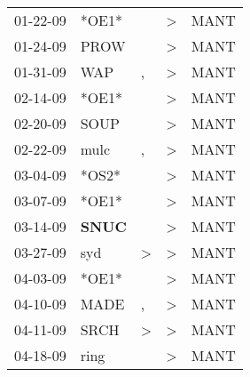 \begin{supertabular}{p{0.07\textwidth}p{0.06\textwidth}p{0.02\textwidth}p{0.02\textwidth}p{0.06\textwidth}}
          01-22-09\textsuperscript{} &                            *OE1* &                  &  \textgreater &           MANT\textsuperscript{} \\
          01-24-09\textsuperscript{} &           PROW\textsuperscript{} &                  &  \textgreater &           MANT\textsuperscript{} \\
          01-31-09\textsuperscript{} &            WAP\textsuperscript{} &                , &  \textgreater &           MANT\textsuperscript{} \\
          02-14-09\textsuperscript{} &                            *OE1* &                  &  \textgreater &           MANT\textsuperscript{} \\
          02-20-09\textsuperscript{} &           SOUP\textsuperscript{} &                  &  \textgreater &           MANT\textsuperscript{} \\
          02-22-09\textsuperscript{} &           mulc\textsuperscript{} &                , &  \textgreater &           MANT\textsuperscript{} \\
          03-04-09\textsuperscript{} &                            *OS2* &                  &  \textgreater &           MANT\textsuperscript{} \\
          03-07-09\textsuperscript{} &                            *OE1* &                  &  \textgreater &           MANT\textsuperscript{} \\
          03-14-09\textsuperscript{} &  \textbf{SNUC\textsuperscript{}} &                  &  \textgreater &           MANT\textsuperscript{} \\
          03-27-09\textsuperscript{} &            syd\textsuperscript{} &     \textgreater &  \textgreater &           MANT\textsuperscript{} \\
          04-03-09\textsuperscript{} &                            *OE1* &                  &  \textgreater &           MANT\textsuperscript{} \\
          04-10-09\textsuperscript{} &           MADE\textsuperscript{} &                , &  \textgreater &           MANT\textsuperscript{} \\
          04-11-09\textsuperscript{} &           SRCH\textsuperscript{} &     \textgreater &  \textgreater &           MANT\textsuperscript{} \\
          04-18-09\textsuperscript{} &           ring\textsuperscript{} &                  &  \textgreater &           MANT\textsuperscript{} \\

\end{supertabular}
